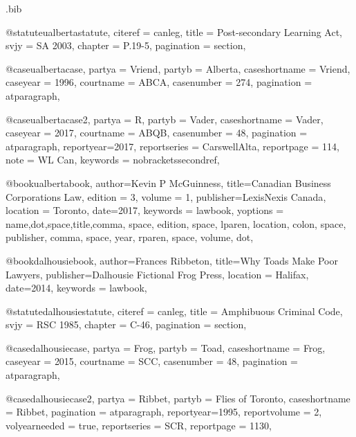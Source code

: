 

\begin{filecontents*}[overwrite]{\jobname.bib}

@statute{ualbertastatute,
citeref = {canleg},
title = {Post-secondary Learning Act},
svjy = {SA 2003},
chapter = {P.19-5},
pagination = {section},
}

@case{ualbertacase,
  partya = {Vriend}, 
  partyb = {Alberta},
  caseshortname = {Vriend},
  caseyear = {1996},
  courtname = {ABCA},
  casenumber = {274},
  pagination = {atparagraph},
	}


@case{ualbertacase2,
  partya = {R}, 
  partyb = {Vader},
  caseshortname = {Vader},
  caseyear = {2017},
  courtname = {ABQB},
  casenumber = {48},
  pagination = {atparagraph},
  reportyear={2017},
  reportseries = {CarswellAlta},
  reportpage = {114},
  note = {WL Can},
  keywords = {nobracketssecondref},
}

@book{ualbertabook,
author={Kevin P McGuinness},
title={Canadian Business Corporations Law},
edition = {3},
volume = {1},
publisher={LexisNexis Canada},
location = {Toronto},
date={2017},
keywords = {lawbook},
yoptions = {name,dot,space,title,comma,
space,
edition,
space,
lparen, 
location,
colon,
space,
publisher,
comma,
space,
year,
rparen,
space,
volume,
dot},
}



@book{dalhousiebook,
author={Frances Ribbeton},
title={Why Toads Make Poor Lawyers},
publisher={Dalhousie Fictional Frog Press},
location = {Halifax},
date={2014},
keywords = {lawbook},
}

@statute{dalhousiestatute,
citeref = {canleg},
title = {Amphibuous Criminal Code},
svjy = {RSC 1985},
chapter = {C-46},
pagination = {section},
}

@case{dalhousiecase,
  partya = {Frog}, 
  partyb = {Toad},
  caseshortname = {Frog},
  caseyear = {2015},
  courtname = {SCC},
  casenumber = {48},
  pagination = {atparagraph},
	}

@case{dalhousiecase2,
  partya = {Ribbet}, 
  partyb = {Flies of Toronto},
  caseshortname = {Ribbet},
  pagination = {atparagraph},
  reportyear={1995},
  reportvolume = {2},
  volyearneeded = {true},
  reportseries = {SCR},
  reportpage = {1130},
	}



\end{filecontents*}
